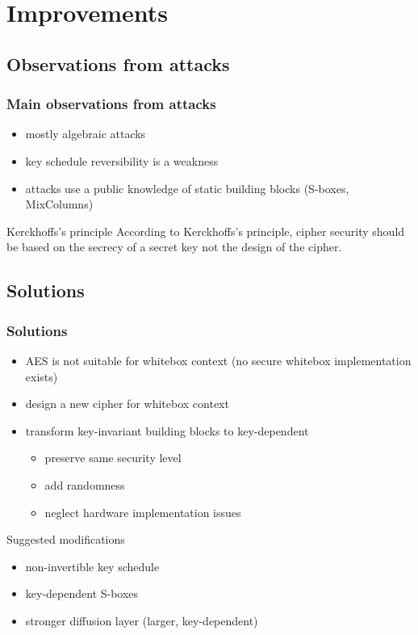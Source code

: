 \documentclass{beamer}
\begin{document}
\section{Improvements}
\subsection{Observations from attacks}
\begin{frame}
    \frametitle{Main observations from attacks}
    \begin{itemize}
     \item mostly algebraic attacks
     \item key schedule reversibility is a weakness
     \item attacks use a public knowledge of static building blocks (S-boxes, MixColumns)
    \end{itemize}
    
    \begin{block}{Kerckhoffs's principle}
	According to Kerckhoffs's principle, cipher security should be based on the secrecy of a secret key not the design of the cipher.
    \end{block}
\end{frame}

\subsection{Solutions}
\begin{frame}
    \frametitle{Solutions}
    \begin{itemize}
     \item AES is not suitable for whitebox context (no secure whitebox implementation exists)
     \item design a new cipher for whitebox context
     \item transform key-invariant building blocks to key-dependent
     \begin{itemize}
      \item preserve same security level
      \item add randomness
      \item neglect hardware implementation issues
     \end{itemize}  
    \end{itemize}
    
    \begin{block}{Suggested modifications}
	\begin{itemize}
	 \item non-invertible key schedule
	 \item key-dependent S-boxes
	 \item stronger diffusion layer (larger, key-dependent)
	\end{itemize}
    \end{block}
\end{frame}
\end{document}
